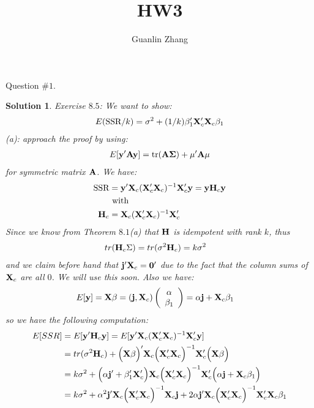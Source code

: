 \documentclass[11pt]{article}
\title{HW3}
\author{Guanlin Zhang}
\newtheorem{sol}{Solution}
\begin{document}
Question $\# 1$.
\begin{sol}
	Exercise $8.5$:\vskip 2mm
	We want to show:
	\begin{align*}
		E(\text{SSR}/k) = \sigma^2 + (1/k){\bf \beta}_1'{\bf X}'_c{\bf X}_c{\bf \beta}_1
	\end{align*}
	(a): approach the proof by using:
	\begin{align*}
		E[{\bf y}'{\bf A}{\bf y}] = \text{tr}({\bf A\Sigma}) + {\bf \mu}'{\bf A}\mu
	\end{align*}
	for symmetric matrix ${\bf A}$.\vskip 2mm
	We have:
	\begin{align*}
		\text{SSR}&= {\bf y}'{\bf X}_c({\bf X}_c'{\bf X}_c)^{-1}{\bf X}_c'{\bf y} = {\bf y}{\bf H}_c{\bf y}\\
		& \text{ with }\\
		{\bf H}_c &= {\bf X}_c({\bf X}_c'{\bf X}_c)^{-1}{\bf X}_c'
	\end{align*}
	Since we know from Theorem $8.1$(a) that ${\bf H}$ is idempotent with rank $k$, thus
	\begin{align*}
		tr({\bf H}_c \Sigma) &= tr(\sigma^2{\bf H}_c) = k\sigma^2
	\end{align*}
	and we claim before hand that ${\bf j'}{\bf X}_c = {\bf 0}'$ due to the fact that the column sums of ${\bf X}_c$ are all $0$. We will use this soon. Also we have:
	\begin{align*}
		E[{\bf y}] &= {\bf X}{\bf \beta} = ({\bf j}, {\bf X}_c)\left(\begin{array}{c} \alpha\\ {\bf \beta}_1 \end{array}\right) = \alpha{\bf j} + {\bf X}_c{\bf \beta}_1
	\end{align*}
	so we have the following computation:
	\begin{align*}
		E[SSR] &= E[{\bf y}'{\bf H}_c{\bf y}] = E[{\bf y}'{\bf X}_c({\bf X}_c'{\bf X}_c)^{-1}{\bf X}_c'{\bf y}]\\
		&= tr(\sigma^2{\bf H}_c) + \Big({\bf X}{\bf \beta}\Big)'{\bf X}_c\Big({\bf X}_c'{\bf X}_c\Big)^{-1}{\bf X}_c'\Big({\bf X}{\bf \beta}\Big)\\
		&= k\sigma^2 + \Big(\alpha{\bf j}' + \beta_1'{\bf X}_c'\Big){\bf X}_c\Big({\bf X}_c'{\bf X}_c\Big)^{-1}{\bf X}_c'\Big(\alpha{\bf j} + {\bf X}_c\beta_1\Big)\\
		&= k\sigma^2 + \alpha^2{\bf j}'{\bf X}_c\Big({\bf X}'_c{\bf X}_c\Big)^{-1}{\bf X}_c{\bf j} + 2\alpha{\bf j}'{\bf X}_c\Big({\bf X}_c'{\bf X}_c\Big)^{-1}{\bf X}_c'{\bf X}_c{\bf \beta}_1\\

\end{align*}
\end{sol}
\end{document}
